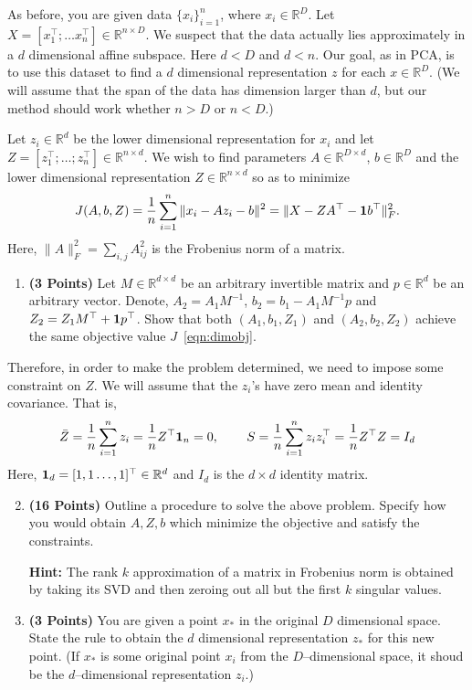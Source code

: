 \documentclass[a4paper]{article}
\newcommand*{\one}{{\bf 1}}
\newcommand{\Zbar}{\bar{Z}}
\theoremstyle{definition}
\newcommand{\RR}{\mathbb{R}}
\begin{document}
As before, you are given data $\{x_i\}_{i=1}^n$, where $x_i \in \RR^D$. Let $X=[x_1^\top; \dots
x_n^\top] \in \RR^{n\times D}$. We suspect that the data
actually lies approximately in  a $d$ dimensional affine subspace.
Here $d<D$ and $d<n$.
Our goal, as in PCA, is to use this dataset to find a $d$ dimensional representation $z$ for each $x\in\RR^D$.
(We will assume that the span of the data has dimension larger than
$d$, but our method should work whether $n>D$ or $n<D$.)


Let $z_i\in \RR^d$ be the lower dimensional representation for $x_i$ and
let $Z = [z_1^\top; \dots; z_n^\top] \in \RR^{n\times d}$.
We wish to find parameters $A \in \RR^{D\times d}$, $b\in\RR^D$ and the lower
dimensional representation $Z\in \RR^{n\times d}$ so as to minimize 
\begin{equation}
J(A,b,Z) = \frac{1}{n} \sum_{i=1}^n \|x_i - Az_i - b\|^2 = \| X - ZA^\top - \one b^\top\|_F^2.
\label{eqn:dimobj}
\end{equation}
Here, $\|A\|^2_F = \sum_{i,j} A_{ij}^2$ is the Frobenius norm of a matrix.


\begin{enumerate}
\item \textbf{(3 Points)}
Let $M\in\RR^{d\times d}$ be an arbitrary invertible matrix and $p\in\RR^{d}$ be an arbitrary vector.
Denote, $A_2 = A_1M^{-1}$, $b_2 = b_1- A_1M^{-1}p$ and $Z_2 = Z_1 M^\top +
\one p^\top$.
Show that both
$(A_1, b_1, Z_1)$ and $(A_2, b_2, Z_2)$ achieve the same objective value $J$~\eqref{eqn:dimobj}.
\end{enumerate}

Therefore, in order to make the problem determined, we need to impose some
constraint on $Z$. We will assume that the $z_i$'s have zero mean and identity covariance.
That is,
\begin{align*}
\Zbar = \frac{1}{n} \sum_{i=1}^n z_i =\frac{1}{n} Z^\top {\bf 1}_n = 0, \hspace{0.3in} 
S = \frac{1}{n} \sum_{i=1}^n z_i z_i^\top 
= \frac{1}{n} Z^\top Z
= I_d
\end{align*}
Here, ${\bf 1}_d = [1, 1 \dots, 1]^\top \in\RR^d$ and $I_d$  is the $d\times d$ identity matrix.

\begin{enumerate}
\setcounter{enumi}{1}
\item \textbf{(16 Points)}
Outline a procedure to solve the above problem. Specify how you
would obtain $A, Z, b$ which minimize the objective and satisfy the constraints.

\textbf{Hint: }The rank $k$ approximation of a matrix in Frobenius norm is obtained by
taking its SVD and then zeroing out all but the first $k$ singular values.

\item \textbf{(3 Points)}
You are given a point $x_*$ in the original $D$ dimensional space.
State the rule to obtain the $d$ dimensional
representation $z_*$ for this new point.
(If $x_*$ is some original point $x_i$ from the $D$--dimensional space, it shoud be the
$d$--dimensional representation $z_i$.)


\end{enumerate}
\end{document}

